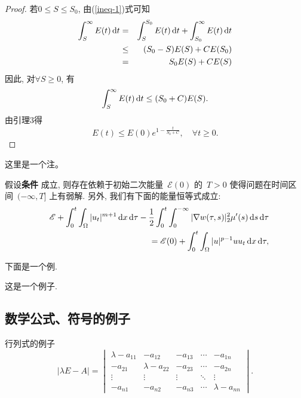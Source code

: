 \begin{proof}
  若$0\leq S\leq S_0$, 由(\ref{ineq-1})式可知
  \begin{eqnarray*}
    \int_S^{\infty} E(t)\mathop{}\!\mathrm{d} t &=& \int_S^{S_0} E(t)\mathop{}\!\mathrm{d} t +\int_{S_0}^{\infty} E(t)\mathop{}\!\mathrm{d} t\\
    &\leq &(S_0-S) E(S)+CE(S_0)\\
    &= &S_0 E(S) +CE(S)
  \end{eqnarray*}
  因此, 对$\forall S\geq 0$, 有
  $$\int_S^{\infty} E(t) \mathop{}\!\mathrm{d} t \leq  (S_0+C)E(S).$$
  由引理3得
  $$E(t)\leq E(0)e^{1-\frac{t}{S_0+C}},\quad \forall t\geq 0.$$
\end{proof}
\begin{remark}
  这里是一个注。
\end{remark}

\begin{theorem}  \label{Thm: local existence}
  假设\textbf{条件} 成立, 则存在依赖于初始二次能量~$\mathscr{E}(0)$ 的~$T>0$ 使得问题在时间区间~$(-\infty, T]$ 上有弱解. 另外, 我们有下面的能量恒等式成立:
  \begin{eqnarray}
    &&\mathscr{E}+\int_0^t\int_\Omega |u_t|^{m+1} \mathop{}\!\mathrm{d} x\mathop{}\!\mathrm{d} \tau-\frac12 \int_0^t\int_0^{-\infty}|\nabla w(\tau,s)|_2^2 \mu'(s)\mathop{}\!\mathrm{d} s\mathop{}\!\mathrm{d} \tau\nonumber\\
    &&=\mathscr{E}(0)+\int_0^t\int_\Omega |u|^{p-1}uu_t\mathop{}\!\mathrm{d} x\mathop{}\!\mathrm{d}\tau,\label{4 quadratic energy identity}
  \end{eqnarray}
\end{theorem}


下面是一个例.
\begin{example}
  这是一个例子.
\end{example}


\subsection{数学公式、符号的例子}

行列式的例子
\begin{equation*}
  |\lambda E- A|=
  \begin{vmatrix}
    \lambda-a_{11} & -a_{12}        & -a_{13} & \cdots & -a_{1n}         \\
    -a_{21}        & \lambda-a_{22} & -a_{23} & \cdots & -a_{2n}         \\
    \vdots         & \vdots         & \vdots  & \ddots & \vdots          \\
    -a_{n1}        & -a_{n2}        & -a_{n3} & \cdots & \lambda -a_{nn}
  \end{vmatrix}.
\end{equation*}

